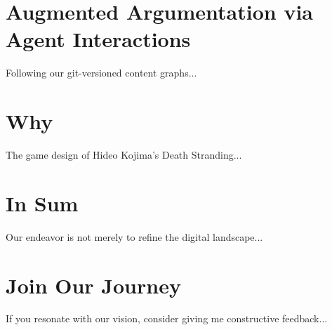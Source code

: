 \documentclass[11pt]{article}
\begin{document}
	\section{Augmented Argumentation via Agent Interactions}
	Following our git-versioned content graphs...
	
	\section{Why}
	The game design of Hideo Kojima's Death Stranding...
	
	\section{In Sum}
	Our endeavor is not merely to refine the digital landscape...
	
	\section{Join Our Journey}
	If you resonate with our vision, consider giving me constructive feedback...
	
	\newpage
	
	
	
	
\end{document}
